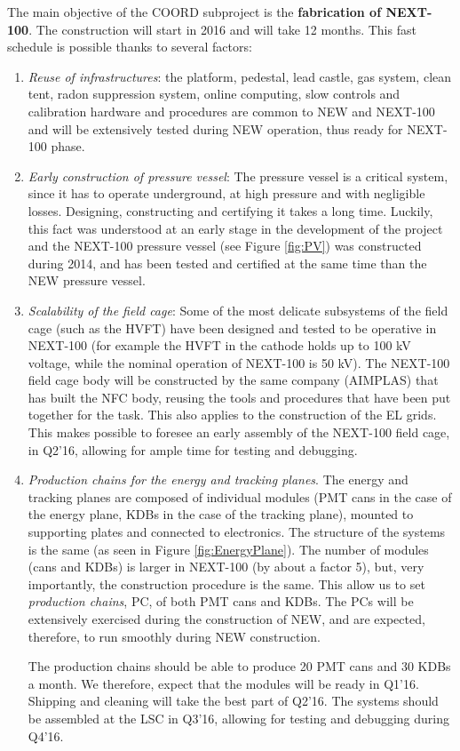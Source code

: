 
The main objective of the COORD subproject is the {\bf fabrication of NEXT-100}. The construction will start in 2016 and will take 12 months. This fast schedule is possible thanks to several factors:
%
\begin{enumerate}
\item {\em Reuse of infrastructures}: the platform, pedestal, lead castle, gas system, clean tent, radon suppression system, online computing, slow controls and calibration hardware and procedures are common to NEW and NEXT-100 and will be extensively tested during NEW operation, thus ready for NEXT-100 phase.
\item {\em Early construction of pressure vessel}: The pressure vessel is a critical system, since it has to operate underground, at high pressure and with negligible losses. Designing, constructing and certifying it takes a long time. Luckily, this fact was understood at an early stage in the development of the project and the NEXT-100 pressure vessel (see Figure \ref{fig:PV}) was constructed during 2014, and has been tested and certified at the same time than the NEW pressure vessel. 
\item {\em Scalability of the field cage}: Some of the most delicate subsystems of the field cage (such as the HVFT) have been designed and tested to be operative in NEXT-100 (for example the HVFT in the cathode holds up to 100 kV voltage, while the nominal operation of NEXT-100 is 50 kV). The NEXT-100 field cage body will be constructed by the same company (AIMPLAS) that has built the NFC body, reusing the tools and procedures that have been put together for the task. This also applies to the construction of the EL grids. 
This makes possible to foresee an early assembly of the NEXT-100 field cage, in Q2'16, allowing for ample time for testing and debugging.

\item {\em Production chains for the energy and tracking planes}. The energy and tracking planes are composed of individual modules (PMT cans in the case of the energy plane, KDBs in the case of the tracking plane), mounted to supporting plates and connected to electronics. The structure of the systems is the same (as seen in Figure \ref{fig:EnergyPlane}). The number of modules (cans and KDBs) is larger in NEXT-100 (by about a factor 5), but, very importantly, the construction procedure is the same. This allow us to set {\em production chains}, PC, of both PMT cans and KDBs. The PCs will be extensively exercised during the construction of NEW, and are expected, therefore, to run smoothly during NEW construction.  

The production chains should be able to produce 20 PMT cans and 30 KDBs a month. We therefore, expect that the modules will be ready in Q1'16. Shipping and cleaning will take the best part of Q2'16. The systems should be assembled at the LSC in Q3'16, allowing for testing and debugging during Q4'16.
\end{enumerate}